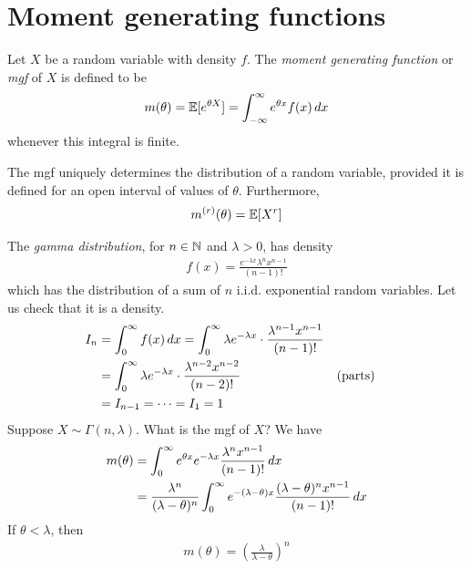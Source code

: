 \documentclass{../../template/note}
\begin{document}
    \section{Moment generating functions}

    \begin{definition}
        Let \(X\) be a random variable with density \(f\). The \emph{moment generating function} or \emph{mgf} of \(X\) is defined to be
        \begin{align*}
            m(\theta) = \mathbb E[e^{\theta X}] = \int_{-\infty}^\infty e^{\theta x}f(x) \,d{x}
        \end{align*}
        whenever this integral is finite.            
    \end{definition}

    \begin{theorem}
        The mgf uniquely determines the distribution of a random variable, provided it is defined for an open interval of values of \(\theta\). Furthermore,
        \begin{align*}
            m^{(r)}(\theta) = \mathbb E[X^r]
        \end{align*}
    \end{theorem}
    
    \begin{example*}
        The \emph{gamma distribution}, for \(n \in \mathbb N\) and \(\lambda > 0\), has density
        \begin{align*}
            f(x) = \frac{e^{-\lambda x}\lambda^nx^{n-1}}{(n-1)!}
        \end{align*}
        which has the distribution of a sum of \(n\) i.i.d. exponential random variables. Let us check that it is a density.
        \begin{align*}
            I_n &= \int_0^\infty f(x) \,d{x} = \int_0^{\infty} \lambda e^{-\lambda x} \cdot \frac{\lambda^{n-1}x^{n-1}}{(n-1)!} \\
            &= \int_0^\infty \lambda e^{-\lambda x} \cdot \frac{\lambda^{n-2}x^{n-2}}{(n-2)!} && \text{(parts)} \\
            &= I_{n-1} = \cdots = I_1 = 1
        \end{align*}
        Suppose \(X \sim \Gamma(n, \lambda)\). What is the mgf of \(X\)? We have
        \begin{align*}
            m(\theta) &= \int_0^\infty e^{\theta x}e^{-\lambda x} \frac{\lambda^n x^{n-1}}{(n-1)!} \,d{x} \\
            &= \frac{\lambda^n}{(\lambda-\theta)^n}\int_0^\infty e^{-(\lambda-\theta)x} \frac{(\lambda-\theta)^nx^{n-1}}{(n-1)!} \,d{x} 
        \end{align*}
        If \(\theta < \lambda\), then
        \begin{align*}
            m(\theta) = \left(\frac{\lambda}{\lambda-\theta}\right)^n
        \end{align*}
    \end{example*}
\end{document}
